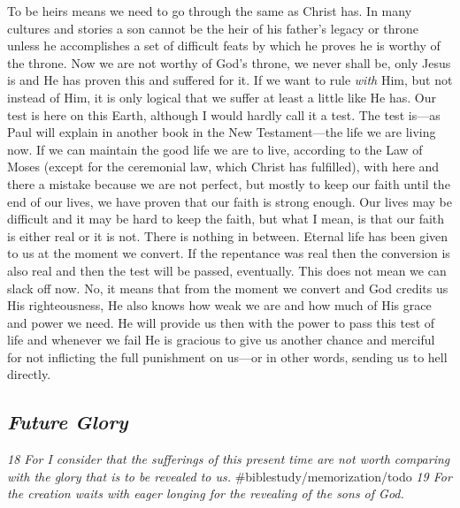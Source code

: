To be heirs means we need to go through the same as Christ has. In many
cultures and stories a son cannot be the heir of his father's legacy or
throne unless he accomplishes a set of difficult feats by which he
proves he is worthy of the throne. Now we are not worthy of God's
throne, we never shall be, only Jesus is and He has proven this and
suffered for it. If we want to rule \emph{with} Him, but not instead of
Him, it is only logical that we suffer at least a little like He has.
Our test is here on this Earth, although I would hardly call it a test.
The test is---as Paul will explain in another book in the New
Testament---the life we are living now. If we can maintain the good life
we are to live, according to the Law of Moses (except for the ceremonial
law, which Christ has fulfilled), with here and there a mistake because
we are not perfect, but mostly to keep our faith until the end of our
lives, we have proven that our faith is strong enough. Our lives may be
difficult and it may be hard to keep the faith, but what I mean, is that
our faith is either real or it is not. There is nothing in between.
Eternal life has been given to us at the moment we convert. If the
repentance was real then the conversion is also real and then the test
will be passed, eventually. This does not mean we can slack off now. No,
it means that from the moment we convert and God credits us His
righteousness, He also knows how weak we are and how much of His grace
and power we need. He will provide us then with the power to pass this
test of life and whenever we fail He is gracious to give us another
chance and merciful for not inflicting the full punishment on us---or in
other words, sending us to hell directly.

\subsection{\emph{Future Glory}} \emph{18 For I consider that the
sufferings of this present time are not worth comparing with the glory
that is to be revealed to us.} \#biblestudy/memorization/todo \emph{19
For the creation waits with eager longing for the revealing of the sons
of God.}


